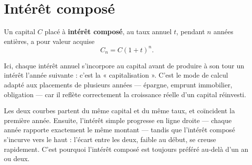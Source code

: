 \section{Intérêt composé}

\begin{definition}
Un capital $C$ placé à \textbf{intérêt composé}, au taux annuel $t$, pendant
$n$ années entières, a pour valeur acquise
\[
  C_{n} = C(1+t)^{n} .
\]
\end{definition}

\begin{remarque}
Ici, chaque intérêt annuel s'incorpore au capital avant de produire à son
tour un intérêt l'année suivante : c'est la « capitalisation ». C'est le mode
de calcul adapté aux placements de plusieurs années — épargne, emprunt
immobilier, obligation — car il reflète correctement la croissance réelle
d'un capital réinvesti.
\end{remarque}

\begin{visualisation}
\begin{center}
\end{center}

Les deux courbes partent du même capital et du même taux, et coïncident la
première année. Ensuite, l'intérêt simple progresse en ligne droite — chaque
année rapporte exactement le même montant — tandis que l'intérêt composé
s'incurve vers le haut : l'écart entre les deux, faible au début, se creuse
rapidement. C'est pourquoi l'intérêt composé est toujours préféré au-delà
d'un an ou deux.
\end{visualisation}

